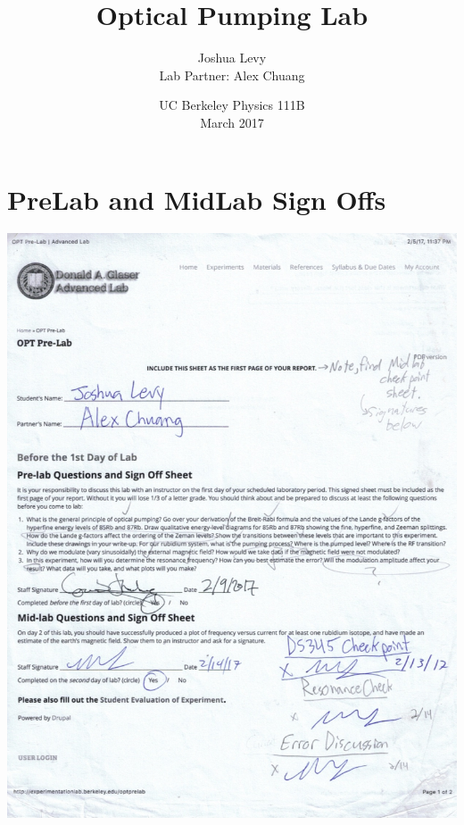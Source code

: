 \documentclass{article}
\title{Optical Pumping Lab}
\author{Joshua Levy\\Lab Partner: Alex Chuang}
\date{UC Berkeley Physics 111B\\March 2017}
\begin{document}
\maketitle

\section{PreLab and MidLab Sign Offs}
\begin{center}
\includegraphics[scale = 0.32]{prelabOPT.jpg}
\end{center}

\newpage
\end{document}
